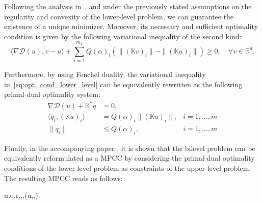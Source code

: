 \documentclass[review,onefignum,onetabnum]{siamonline190516}
\newcommand{\R}{\mathbb{R}}
\newcommand{\Jcal}{\mathcal{J}}
\newcommand{\Dcal}{\mathcal{D}}
\newcommand{\scalar}[2]{\langle #1 , #2 \rangle}
\begin{document}
Following the analysis in~\cite{de2023bilevel}, and under the previously stated assumptions on the regularity and convexity of the lower-level problem, we can guarantee the existence of a unique minimizer. Moreover, its necessary and sufficient optimality condition is given by the following variational inequality of the second kind:
\begin{equation}\label{eq:opt_cond_lower_level}
    \scalar{\nabla \Dcal(u)}{v - u} + \sum_{i=1}^{m_1} Q(\alpha)_i\left(\|( \mathbb{K} v)_i\| - \|(\mathbb{K} u)_i\|\right) \ge 0,\quad\forall v\in\R^d.
\end{equation}

Furthermore, by using Fenchel duality, the variational inequality in~\cref{eq:opt_cond_lower_level} can be equivalently rewritten as the following primal-dual optimality system:
\begin{align}
\nabla \Dcal(u)+\mathbb{K}^\ast q &=0,\label{eq:opt_cond_primal}\\
\scalar{q_i}{(\mathbb{K}u)_i} &= Q(\alpha)_i\|(\mathbb{K} u)_i\|,&i=1,\dots,m\label{eq:opt_cond_dual_1}\\
\|q_i\|&\le Q(\alpha)_i,&i=1,\dots,m\label{eq:opt_cond_dual_2}
\end{align}

Finally, in the accompanying paper \cite{de2023bilevel}, it is shown that the bilevel problem can be equivalently reformulated as a MPCC by considering the primal-dual optimality conditions of the lower-level problem as constraints of the upper-level problem. The resulting MPCC reads as follows:
\begin{mini!}
  {u,q,r,\delta,\theta,\alpha}{\Jcal(u,\alpha,\sigma)}{}{}
  \addConstraint{\nabla \Dcal(u)+\mathbb{K}^\ast q + \mathbb{B}^\ast c =0}
\end{mini!}
\end{document}
